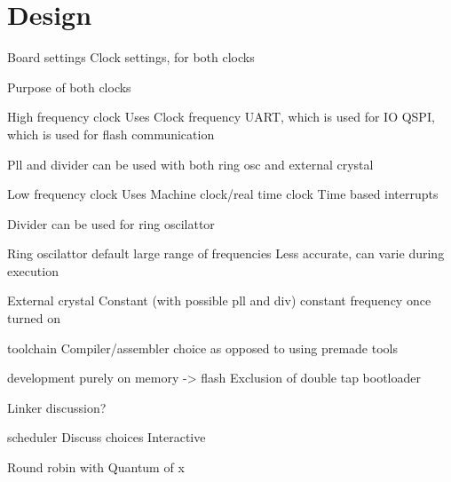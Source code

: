 \chapter{Design}
\label{cha:design}

Board settings
    Clock settings, for both clocks

Purpose of both clocks

High frequency clock
    Uses
        Clock frequency
        UART, which is used for IO
        QSPI, which is used for flash communication

    Pll and divider can be used with both ring osc and external crystal



Low frequency clock
    Uses
        Machine clock/real time clock
        Time based interrupts

    Divider can be used for ring oscilattor


Ring oscilattor
    default
    large range of frequencies
    Less accurate, can varie during execution

External crystal
    Constant (with possible pll and div)
    constant frequency once turned on



toolchain   
    Compiler/assembler choice as opposed to using premade tools

    development purely on memory -> flash  
        Exclusion of double tap bootloader

    Linker discussion?

scheduler
    Discuss choices
        Interactive

        Round robin
            with Quantum of x

        